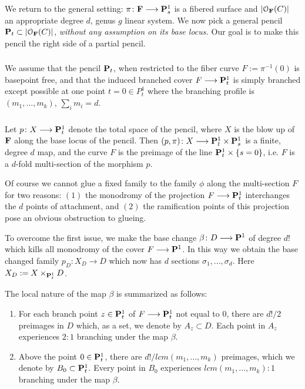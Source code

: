 \documentclass[reqno, 10 pt]{article}
\theoremstyle{definition}
\theoremstyle{remark}
\numberwithin{equation}{section}
\numberwithin{thm}{section}
\numberwithin{prop}{section}
\numberwithin{lem}{section}
\numberwithin{cor}{section}
\numberwithin{conj}{section}
\numberwithin{defn}{section}
\newcommand{\F}{{\mathbf F}}
\renewcommand{\to}{\longrightarrow}
\newcommand{\cO}{{\mathcal O}}
\renewcommand{\P}{{\bf P}}
\renewcommand{\F}{{\bf F}}
\newcommand {\from}{{\colon}}
\begin{document}
    We return to the general setting: $\pi \from \F \to \P^{1}_{s}$ is a fibered surface and $|\cO_{\F}(C)|$ an appropriate degree $d$, genus $g$ linear system.  We now pick a general pencil $\P_{t} \subset |\cO_{\F}(C)|$, {\sl without any assumption on its base locus.}  Our goal is to make this pencil the right side of a partial pencil.
    
  \subsubsection{}\label{branchingprofilepentagonalfamily}  
    We assume that the pencil $\P_{t}$, when restricted to the fiber curve $F := \pi^{-1}(0)$ is basepoint free, and that the induced branched cover $F \to \P^{1}_{t}$ is simply branched except possible at one point $t = 0 \in P^{1}_{t}$ where the branching profile is $(m_{1}, ... , m_{k})$, $\sum_{i}m_{i} = d$.

  \subsubsection{}

    Let $p \from X \to \P^{1}_{t}$ denote the total space of the pencil, where $X$ is the blow up of $\F$ along the base locus of the pencil.  Then $(p, \pi) \from X \to \P^{1}_{t} \times \P^{1}_{s}$ is a finite, degree $d$ map, and the curve $F$ is the preimage of the line $\P^{1}_{t} \times \{s = 0\}$, i.e. $F$ is a $d$-fold multi-section of the morphism $p$.  

    Of course we cannot glue a fixed family to the family $\phi$ along the multi-section $F$ for two reasons: $(1)$ the monodromy of the projection $F \to \P^{1}_{t}$ interchanges the $d$ points of attachment, and $(2)$ the ramification points of this projection pose an obvious obstruction to glueing. 

  
    To overcome the first issue, we make the base change $\beta \from D \to \P^{1}$ of degree $d !$ which kills all monodromy of the cover $F \to \P^{1}$.   In this way we obtain the base changed family $p_{D} \from X_{D} \to D$ which now has $d$ sections $\sigma_{1}, ... ,\sigma_{d}$. Here $X_{D} := X \times_{\P^{1}_{t}}D$.  

    The local nature of the map $\beta$ is summarized as follows:
    \begin{enumerate}\label{localbasechangedescription}
    \item For each branch point $z\in \P^{1}_{t}$ of $F \to \P^{1}_{t}$ not equal to $0$, there are $d!/2$ preimages in $D$ which, as a set, we denote by $A_{z} \subset D$.  Each point in $A_{z}$ experiences $2:1$ branching under the map $\beta$. 
    \item Above the point $0 \in \P^{1}_{t}$, there are $d!/lcm(m_{1}, ... ,m_{k})$ preimages, which we denote by $B_{0} \subset \P^{1}_{t}$. Every point in $B_{0}$ experiences $lcm(m_{1}, ... ,m_{k}):1$ branching under the map $\beta$.

    \end{enumerate}
\end{document}
